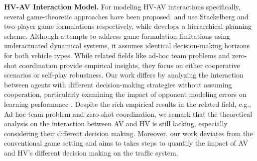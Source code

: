 {\bf HV-AV Interaction Model.} For modeling HV-AV interactions specifically, several game-theoretic approaches have been proposed. \cite{tian2022safety} and \cite{sadigh2016planning} use Stackelberg and two-player game formulations respectively, while \cite{fisac2019hierarchical} develops a hierarchical planning scheme. Although \cite{sadigh2018planning} attempts to address game formulation limitations using underactuated dynamical systems, it assumes identical decision-making horizons for both vehicle types. While related fields like ad-hoc team problems \cite{mirsky2022survey} and zero-shot coordination \cite{hu2020other} provide empirical insights, they focus on either cooperative scenarios or self-play robustness. Our work differs by analyzing the interaction between agents with different decision-making strategies without assuming cooperation, particularly examining the impact of opponent modeling errors on learning performance \cite{albrecht2018autonomous}. Despite the rich empirical results in the related field, e.g., Ad-hoc team problem and zero-shot coordination, we remark that the theoretical analysis on the interaction between AV and HV is still lacking, especially considering their different decision making. Moreover, our work deviates from the conventional game setting and  aims to takes steps to quantify the impact of AV and HV's different decision making on the traffic system.  



